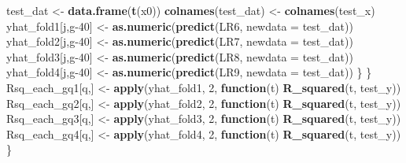 \documentclass[
]{article}
\newenvironment{Shaded}{\begin{snugshade}}{\end{snugshade}}
\newcommand{\AttributeTok}[1]{\textcolor[rgb]{0.13,0.29,0.53}{#1}}
\newcommand{\ControlFlowTok}[1]{\textcolor[rgb]{0.13,0.29,0.53}{\textbf{#1}}}
\newcommand{\DecValTok}[1]{\textcolor[rgb]{0.00,0.00,0.81}{#1}}
\newcommand{\FunctionTok}[1]{\textcolor[rgb]{0.13,0.29,0.53}{\textbf{#1}}}
\newcommand{\NormalTok}[1]{#1}
\newcommand{\OtherTok}[1]{\textcolor[rgb]{0.56,0.35,0.01}{#1}}
\begin{document}
\begin{Shaded}
\begin{Highlighting}[]
\NormalTok{          test\_dat }\OtherTok{\textless{}{-}} \FunctionTok{data.frame}\NormalTok{(}\FunctionTok{t}\NormalTok{(x0))}
          \FunctionTok{colnames}\NormalTok{(test\_dat) }\OtherTok{\textless{}{-}} \FunctionTok{colnames}\NormalTok{(test\_x)}
\NormalTok{          yhat\_fold1[j,g}\DecValTok{{-}40}\NormalTok{] }\OtherTok{\textless{}{-}} \FunctionTok{as.numeric}\NormalTok{(}\FunctionTok{predict}\NormalTok{(LR6, }\AttributeTok{newdata =}\NormalTok{ test\_dat))}
\NormalTok{          yhat\_fold2[j,g}\DecValTok{{-}40}\NormalTok{] }\OtherTok{\textless{}{-}} \FunctionTok{as.numeric}\NormalTok{(}\FunctionTok{predict}\NormalTok{(LR7, }\AttributeTok{newdata =}\NormalTok{ test\_dat))}
\NormalTok{          yhat\_fold3[j,g}\DecValTok{{-}40}\NormalTok{] }\OtherTok{\textless{}{-}} \FunctionTok{as.numeric}\NormalTok{(}\FunctionTok{predict}\NormalTok{(LR8, }\AttributeTok{newdata =}\NormalTok{ test\_dat))}
\NormalTok{          yhat\_fold4[j,g}\DecValTok{{-}40}\NormalTok{] }\OtherTok{\textless{}{-}} \FunctionTok{as.numeric}\NormalTok{(}\FunctionTok{predict}\NormalTok{(LR9, }\AttributeTok{newdata =}\NormalTok{ test\_dat))}
\NormalTok{        \}}
\NormalTok{      \}}
\NormalTok{      Rsq\_each\_gq1[q,] }\OtherTok{\textless{}{-}} \FunctionTok{apply}\NormalTok{(yhat\_fold1, }\DecValTok{2}\NormalTok{, }\ControlFlowTok{function}\NormalTok{(t) }\FunctionTok{R\_squared}\NormalTok{(t, test\_y))}
\NormalTok{      Rsq\_each\_gq2[q,] }\OtherTok{\textless{}{-}} \FunctionTok{apply}\NormalTok{(yhat\_fold2, }\DecValTok{2}\NormalTok{, }\ControlFlowTok{function}\NormalTok{(t) }\FunctionTok{R\_squared}\NormalTok{(t, test\_y))}
\NormalTok{      Rsq\_each\_gq3[q,] }\OtherTok{\textless{}{-}} \FunctionTok{apply}\NormalTok{(yhat\_fold3, }\DecValTok{2}\NormalTok{, }\ControlFlowTok{function}\NormalTok{(t) }\FunctionTok{R\_squared}\NormalTok{(t, test\_y))}
\NormalTok{      Rsq\_each\_gq4[q,] }\OtherTok{\textless{}{-}} \FunctionTok{apply}\NormalTok{(yhat\_fold4, }\DecValTok{2}\NormalTok{, }\ControlFlowTok{function}\NormalTok{(t) }\FunctionTok{R\_squared}\NormalTok{(t, test\_y))}
\NormalTok{    \}}
    

\end{Highlighting}
\end{Shaded}
\end{document}
